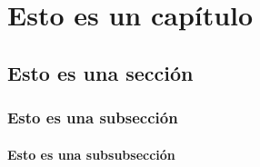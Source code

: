 \documentclass{scrbook}
\begin{document}



\tableofcontents

\chapter{Esto es un capítulo}

\section{Esto es una sección}

\subsection{Esto es una subsección}

\subsubsection{Esto es una subsubsección}
\end{document}
